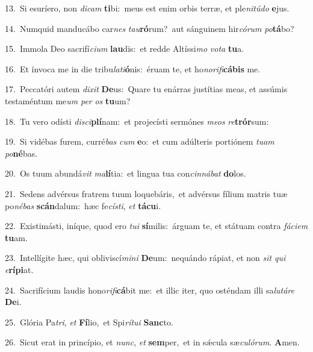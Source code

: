 {\numbfont\textcolor{\numbcolor}{13.}}~Si esuríero, non \textit{di}\-\textit{cam} \textbf{ti}\-bi:~\star meus est enim orbis terræ, et ple\-\textit{ni}\-\textit{tú}\textit{do} \textbf{e}\-jus.\par
{\numbfont\textcolor{\numbcolor}{14.}}~Numquid manducábo car\textit{nes} \textit{tau}\-\textbf{ró}rum?~\star aut sánguinem hir\-\textit{có}\-\textit{rum} \textit{po}\-\textbf{tá}bo?\par
{\numbfont\textcolor{\numbcolor}{15.}}~Immola Deo sacrifí\-\textit{ci}\-\textit{um} \textbf{lau}\-dis:~\star et redde Altíssi\textit{mo} \textit{vo}\-\textit{ta} \textbf{tu}\-a.\par
{\numbfont\textcolor{\numbcolor}{16.}}~Et ínvoca me in die tribu\-\textit{la}\-\textit{ti}\textbf{ó}nis:~\star éruam te, et ho\-\textit{no}\-\textit{ri}\textit{fi}\textbf{cá}\textbf{bis} me.\par
{\numbfont\textcolor{\numbcolor}{17.}}~Peccatóri autem \textit{di}\-\textit{xit} \textbf{De}\-us:~\star Quare tu enárras justítias meas, et assúmis testaméntum me\textit{um} \textit{per} \textit{os} \textbf{tu}\-um?\par
{\numbfont\textcolor{\numbcolor}{18.}}~Tu vero odísti \textit{di}\-\textit{sci}\textbf{plí}nam:~\star et projecísti sermónes \textit{me}\-\textit{os} \textit{re}\-\textbf{trór}sum:\par
{\numbfont\textcolor{\numbcolor}{19.}}~Si vidébas furem, curré\textit{bas} \textit{cum} \textbf{e}\-o:~\star et cum adúlteris portiónem \textit{tu}\-\textit{am} \textit{po}\-\textbf{né}bas.\par
{\numbfont\textcolor{\numbcolor}{20.}}~Os tuum abundá\textit{vit} \textit{ma}\-\textbf{lí}tia:~\star et lingua tua con\-\textit{cin}\-\textit{ná}\textit{bat} \textbf{do}\-los.\par
{\numbfont\textcolor{\numbcolor}{21.}}~Sedens advérsus fratrem tuum loquebáris,~\dagger et advérsus fílium matris tuæ po\-\textit{né}\-\textit{bas} \textbf{scán}\-dalum:~\star hæc fe\-\textit{cís}\-\textit{ti}, \textit{et} \textbf{tá}\-\textbf{cu}i.\par
{\numbfont\textcolor{\numbcolor}{22.}}~Existimásti, iníque, quod ero \textit{tu}\-\textit{i} \textbf{sí}\-milis:~\star árguam te, et státuam contra \textit{fá}\-\textit{ci}\textit{em} \textbf{tu}\-am.\par
{\numbfont\textcolor{\numbcolor}{23.}}~Intellígite hæc, qui obliviscí\-\textit{mi}\-\textit{ni} \textbf{De}\-um:~\star nequándo rápiat, et non \textit{sit} \textit{qui} \textit{e}\-\textbf{rí}\textbf{pi}at.\par
{\numbfont\textcolor{\numbcolor}{24.}}~Sacrifícium laudis hono\-\textit{ri}\-\textit{fi}\textbf{cá}bit me:~\star et illic iter, quo osténdam illi sa\-\textit{lu}\-\textit{tá}\textit{re} \textbf{De}\-i.\par
{\numbfont\textcolor{\numbcolor}{25.}}~Glória Pa\-\textit{tri}\-, \textit{et} \textbf{Fí}\-lio,~\star et Spi\-\textit{rí}\-\textit{tu}\textit{i} \textbf{Sanc}\-to.\par
{\numbfont\textcolor{\numbcolor}{26.}}~Sicut erat in princípio, et \textit{nunc}\-, \textit{et} \textbf{sem}\-per,~\star et in sǽcula sæ\-\textit{cu}\-\textit{ló}\textit{rum}. \textbf{A}\-men.\par
